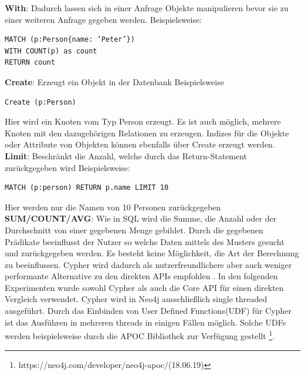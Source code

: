 \textbf{With}: Dadurch lassen sich in einer Anfrage Objekte manipulieren bevor sie zu einer weiteren Anfrage gegeben werden. Beispielsweise:
\begin{Verbatim}[frame=single]
MATCH (p:Person{name: ‘Peter’})  
WITH COUNT(p) as count  
RETURN count
\end{Verbatim} 
\textbf{Create}: Erzeugt ein Objekt in der Datenbank Beispielsweise 
\begin{Verbatim}[frame=single]
Create (p:Person)
\end{Verbatim}
Hier wird ein Knoten vom Typ Person erzeugt. Es ist auch möglich, mehrere Knoten mit den dazugehörigen Relationen zu erzeugen. Indizes  für die Objekte oder Attribute von Objekten können ebenfalls über Create erzeugt werden.\newline
\textbf{Limit}: Beschränkt die Anzahl, welche durch das Return-Statement zurückgegeben wird Beispielsweise:
\begin{Verbatim}[frame=single]
MATCH (p:person) RETURN p.name LIMIT 10
\end{Verbatim} 
Hier werden nur die Namen  von 10 Personen zurückgegeben\newline
\textbf{SUM/COUNT/AVG}: Wie in SQL wird die Summe, die Anzahl oder der Durchschnitt von einer gegebenen Menge gebildet. \newline \newline
Durch die gegebenen Prädikate beeinflusst der Nutzer so welche Daten mittels des Musters gesucht und zurückgegeben werden. Es besteht keine Möglichkeit, die Art der Berechnung zu beeinflussen. Cypher wird dadurch als nutzerfreundlichere aber auch weniger performante Alternative zu den direkten APIs empfohlen \parencite{vukotic2015neo4j}. In den folgenden Experimenten wurde sowohl Cypher als auch die Core API für einen direkten Vergleich verwendet. Cypher wird in Neo4j ausschließlich  single threaded ausgeführt. Durch das Einbinden von User Defined Functions(UDF) für Cypher ist das Ausführen in mehreren threads in einigen Fällen möglich. Solche UDFs werden beispielsweise durch die APOC Bibliothek zur Verfügung gestellt \footnote{https://neo4j.com/developer/neo4j-apoc/(18.06.19)}.

